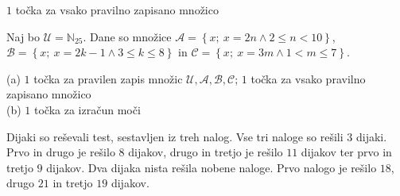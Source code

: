 \documentclass[addpoints]{exam}
\begin{document}
\begin{questions}


    \begin{solution}[1cm]
        $1$ točka za vsako pravilno zapisano množico
    \end{solution}




    \newpage

    \question
    Naj bo $\mathcal{U}=\mathbb{N}_{25}$. Dane so množice $\mathcal{A}=\left\{x;\ x=2n \land 2\leq n<10\right\}$, $\mathcal{B}=\left\{x;\ x=2k-1 \land 3\leq k\leq 8\right\}$ in $\mathcal{C}=\left\{x;\ x=3m \land 1<m\leq 7\right\}$. 

    \begin{solution}[8cm]
        (a) $1$ točka za pravilen zapis množic $\mathcal{U}, \mathcal{A}, \mathcal{B}, \mathcal{C}$; $1$ točka za vsako pravilno zapisano množico \\
        (b) $1$ točka za izračun moči
            \end{solution}


    \question[5]
    Dijaki so reševali test, sestavljen iz treh nalog. Vse tri naloge so rešili $3$ dijaki. 
    Prvo in drugo je rešilo $8$ dijakov, drugo in tretjo je rešilo $11$ dijakov ter prvo in tretjo $9$ dijakov.
    Dva dijaka nista rešila nobene naloge. Prvo nalogo je rešilo $18$, drugo $21$ in tretjo $19$ dijakov.
\end{questions}
\end{document}
